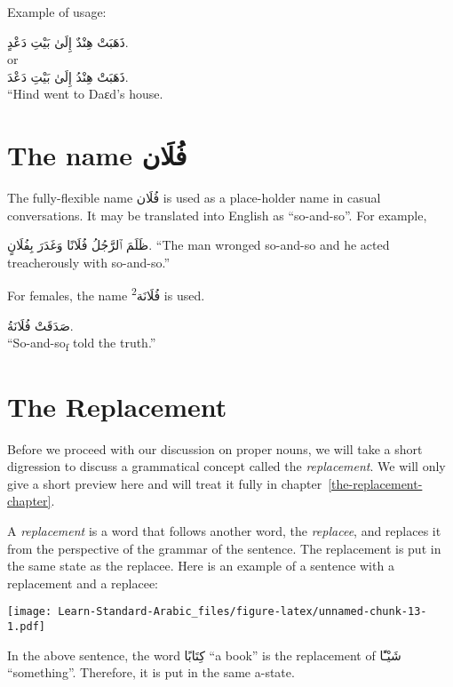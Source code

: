 \documentclass[
  10pt,
]{book}
\begin{document}
Example of usage:

\foreignlanguage{arabic}{ذَهَبَتْ هِنْدٌ إِلَىٰ بَيْتِ دَعْدٍ.}\\
or\\
\foreignlanguage{arabic}{ذَهَبَتْ هِنْدُ إِلَىٰ بَيْتِ دَعْدَ.}\\
``Hind went to Daɛd's house.

\section{\texorpdfstring{The name \foreignlanguage{arabic}{فُلَان}}{The name فُلَان}}\label{the-name-ux641ux644ux627ux646}

The fully-flexible name \foreignlanguage{arabic}{فُلَان} is used as a place-holder name in casual conversations. It may be translated into English as \enquote{so-and-so}. For example,

\foreignlanguage{arabic}{ظَلَمَ ٱلرَّجُلُ فُلَانًا وَغَدَرَ بِفُلَانٍ.}
\enquote{The man wronged so-and-so and he acted treacherously with so-and-so.}

For females, the name \textsuperscript{2}\foreignlanguage{arabic}{فُلَانَة} is used.

\foreignlanguage{arabic}{صَدَقَتْ فُلَانَةُ.}\\
\enquote{So-and-so\textsubscript{f} told the truth.}

\section{The Replacement}\label{the-replacement}

Before we proceed with our discussion on proper nouns, we will take a short digression to discuss a grammatical concept called the \emph{replacement}. We will only give a short preview here and will treat it fully in chapter~\ref{the-replacement-chapter}.

A \emph{replacement} is a word that follows another word, the \emph{replacee}, and replaces it from the perspective of the grammar of the sentence. The replacement is put in the same state as the replacee.
Here is an example of a sentence with a replacement and a replacee:

\texttt{[image: Learn-Standard-Arabic\_files/figure-latex/unnamed-chunk-13-1.pdf]}

In the above sentence, the word \foreignlanguage{arabic}{کِتَابًا} \enquote{a book} is the replacement of
\foreignlanguage{arabic}{شَيْـًٔا} \enquote{something}. Therefore, it is put in the same a-state.
\end{document}
